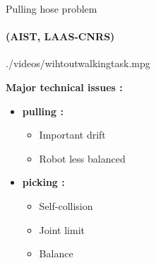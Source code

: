 \begin{frame}{Pulling hose problem}
\framesubtitle{(AIST, LAAS-CNRS)}
%
  \begin{center}
    {./videos/wihtoutwalkingtask.mpg}\\
  \end{center}
  \textbf{\color{txtcolor2} Major technical issues :}\\
  \begin{minipage}{0.48\textwidth}
    \begin{itemize}
      \item \textbf{\color{txtcolor2} pulling :}
      \begin{itemize}
        \item Important drift
        \item Robot less balanced
      \end{itemize}
    \end{itemize}
  \end{minipage}
%    
  \begin{minipage}{0.48\textwidth}
    \begin{itemize}
      \item \textbf{\color{txtcolor2} picking :}
      \begin{itemize}
        \item Self-collision
        \item Joint limit
        \item Balance
      \end{itemize}
    \end{itemize}
  \end{minipage}
%

\end{frame} 
 
